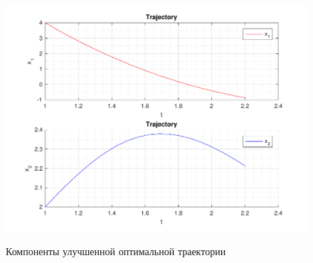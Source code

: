 \documentclass[11pt, oneside, final]{article}
\theoremstyle{break}
\numberwithin{equation}{section}
\theoremstyle{plain}
\theoremstyle{definition}
\begin{document}
    \begin{figure}[H]
            \centering
            \includegraphics[width=\linewidth]{s4fig2}
            \label{pic:s4:2}
            \caption{Компоненты улучшенной оптимальной траектории}
    \end{figure}
    
\end{document}
